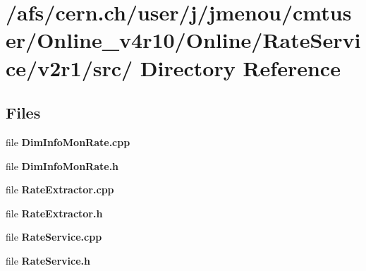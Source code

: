 \section{/afs/cern.ch/user/j/jmenou/cmtuser/Online\_\-v4r10/Online/Rate\-Service/v2r1/src/ Directory Reference}
\label{dir_000000}
\subsection*{Files}
\begin{CompactItemize}
\item 
file {\bf Dim\-Info\-Mon\-Rate.cpp}
\item 
file {\bf Dim\-Info\-Mon\-Rate.h}
\item 
file {\bf Rate\-Extractor.cpp}
\item 
file {\bf Rate\-Extractor.h}
\item 
file {\bf Rate\-Service.cpp}
\item 
file {\bf Rate\-Service.h}
\end{CompactItemize}
